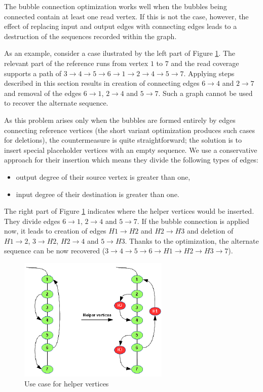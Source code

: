 The bubble connection optimization works well when the bubbles being connected contain at least one read vertex. If this is not the case, however, the effect of replacing input and output edges with connecting edges leads to a destruction of the sequences recorded within the graph.

As an example, consider a case ilustrated by the left part of Figure \ref{fig:helper-vertices}. The relevant part of the reference runs from vertex $1$ to $7$ and the read coverage supports a path of $3 \to 4 \to 5 \to 6 \to 1 \to 2 \to 4 \to 5 \to 7$. Applying steps described in this section results  in creation of connecting edges $6 \to 4$ and $2 \to 7$ and removal of the edges $6 \to 1$, $2 \to 4$ and $5 \to 7$. Such a graph cannot be used to recover the alternate sequence.

As this problem arises only when the bubbles are formed entirely by edges connecting reference vertices (the short variant optimization produces such cases for deletions), the countermeasure is quite straightforward; the solution is to  insert special placeholder vertices with an empty sequence. We use a conservative approach for their insertion which means they divide the following types of edges:
\begin{itemize}
\item output degree of their source vertex is greater than one,
\item input degree of their destination is greater than one.
\end{itemize}
The right part of Figure \ref{fig:helper-vertices} indicates where the helper vertices would be inserted. They divide edges $6 \to 1$, $2 \to 4$ and $5 \to 7$. If the bubble connection is applied now, it leads to creation of edges $H1 \to H2$ and $H2 \to H3$ and deletion of $H1 \to 2$, $3 \to H2$, $H2 \to 4$ and $5 \to H3$. Thanks to the optimization, the alternate sequence can be now recovered ($3 \to 4 \to 5 \to 6 \to H1 \to H2 \to H3 \to 7$).

\begin{figure}[h]
	\centering
	\includegraphics{img/helper-vertices.pdf}
	\caption{Use case for helper vertices}
	\label{fig:helper-vertices}
\end{figure}


